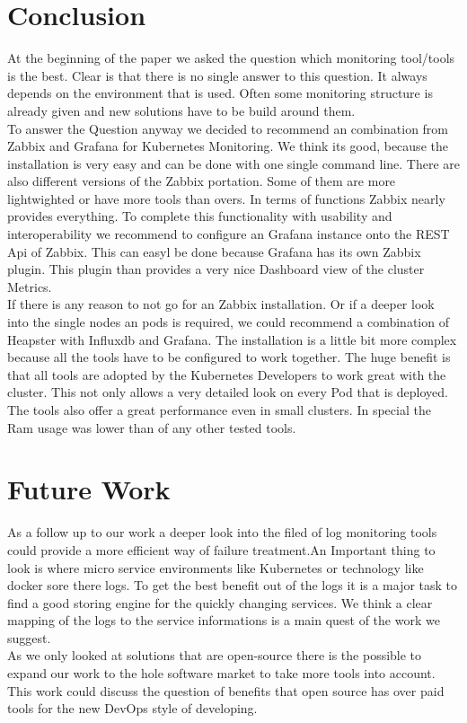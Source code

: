 \section{Conclusion}
At the beginning of the paper we asked the question which monitoring tool/tools is the best. Clear is that there is no single answer to this question. It always depends on the environment that is used. Often some monitoring structure is already given and new solutions have to be build around them.\\
To answer the Question anyway we decided to recommend an combination from Zabbix and Grafana for Kubernetes Monitoring. We think its good, because the installation is very easy and can be done with one single command line. There are also different versions of the Zabbix portation. Some of them are more lightwighted or have more tools than overs. In terms of functions Zabbix nearly provides everything. To complete this functionality with usability and interoperability we recommend to configure an Grafana instance onto the REST Api of Zabbix. This can easyl be done because Grafana has its own Zabbix plugin. This plugin than provides a very nice Dashboard view of the cluster Metrics.
\\
If there is any reason to not go for an Zabbix installation. Or if a deeper look into the single nodes an pods is required, we could recommend a combination of Heapster with Influxdb and Grafana. The installation is a little bit more complex because all the tools have to be configured to work together. The huge benefit is that all tools are adopted by the Kubernetes Developers to work great with the cluster. This not only allows a very detailed look on every Pod that is deployed. The tools also offer a great performance even in small clusters. In special the Ram usage was lower than of any other tested tools.

\section*{Future Work}
As a follow up to our work a deeper look into the filed of log monitoring tools could provide a more efficient way of failure treatment.An Important thing to look is where micro service environments like Kubernetes or technology like docker sore there logs. To get the best benefit out of the logs it is a major task to find a good storing engine for the quickly changing services. We think a clear mapping of the logs to the service informations is a main quest of the work we suggest.\\
As we only looked at solutions that are open-source there is the possible to expand our work to the hole software market to take more tools into account. This work could discuss the question of benefits that open source has over paid tools for the new DevOps style of developing.

